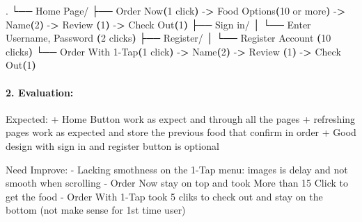 \documentclass[
]{article}
\newenvironment{Shaded}{\begin{snugshade}}{\end{snugshade}}
\newcommand{\BuiltInTok}[1]{#1}
\newcommand{\ErrorTok}[1]{\textcolor[rgb]{0.64,0.00,0.00}{\textbf{#1}}}
\newcommand{\ExtensionTok}[1]{#1}
\newcommand{\KeywordTok}[1]{\textcolor[rgb]{0.13,0.29,0.53}{\textbf{#1}}}
\newcommand{\NormalTok}[1]{#1}
\newcommand{\OperatorTok}[1]{\textcolor[rgb]{0.81,0.36,0.00}{\textbf{#1}}}
\newcommand{\StringTok}[1]{\textcolor[rgb]{0.31,0.60,0.02}{#1}}
\newcommand{\VariableTok}[1]{\textcolor[rgb]{0.00,0.00,0.00}{#1}}
\begin{document}
\begin{Shaded}
\begin{Highlighting}[]
\BuiltInTok{.}
\ExtensionTok{└──}\NormalTok{ Home Page/}
    \ExtensionTok{├──}\NormalTok{ Order Now}\ErrorTok{(}\ExtensionTok{1}\NormalTok{ click}\KeywordTok{)} \ExtensionTok{{-}}\OperatorTok{\textgreater{}}\NormalTok{ Food Options}\ErrorTok{(}\ExtensionTok{10}\NormalTok{ or more}\KeywordTok{)} \ExtensionTok{{-}}\OperatorTok{\textgreater{}}\NormalTok{ Name}\ErrorTok{(}\ExtensionTok{2}\KeywordTok{)} \ExtensionTok{{-}}\OperatorTok{\textgreater{}}\NormalTok{ Review }\ErrorTok{(}\ExtensionTok{1}\KeywordTok{)} \ExtensionTok{{-}}\OperatorTok{\textgreater{}}\NormalTok{ Check Out}\ErrorTok{(}\ExtensionTok{1}\KeywordTok{)}
    \ExtensionTok{├──}\NormalTok{ Sign in/}
    \ExtensionTok{│}\NormalTok{   └── Enter Username, Password }\ErrorTok{(}\ExtensionTok{2}\NormalTok{ clicks}\KeywordTok{)} 
    \ExtensionTok{├──}\NormalTok{ Register/}
    \ExtensionTok{│}\NormalTok{   └── Register Account }\ErrorTok{(}\ExtensionTok{10}\NormalTok{ clicks}\KeywordTok{)}
    \ExtensionTok{└──}\NormalTok{ Order With 1{-}Tap}\ErrorTok{(}\ExtensionTok{1}\NormalTok{ click}\KeywordTok{)} \ExtensionTok{{-}}\OperatorTok{\textgreater{}}\NormalTok{ Name}\ErrorTok{(}\ExtensionTok{2}\KeywordTok{)} \ExtensionTok{{-}}\OperatorTok{\textgreater{}}\NormalTok{ Review }\ErrorTok{(}\ExtensionTok{1}\KeywordTok{)} \ExtensionTok{{-}}\OperatorTok{\textgreater{}}\NormalTok{ Check Out}\ErrorTok{(}\ExtensionTok{1}\KeywordTok{)}
\end{Highlighting}
\end{Shaded}

\hypertarget{evaluation}{%
\paragraph{2. Evaluation:}\label{evaluation}}

\begin{Shaded}
\begin{Highlighting}[]
\NormalTok{Expected:}
\VariableTok{+ Home Button work as expect and through all the pages}
\VariableTok{+ refreshing pages work as expected and store the previous food that confirm in order}
\VariableTok{+ Good design with \textquotesingle{}sign in\textquotesingle{} and \textquotesingle{}register button\textquotesingle{} is optional}

\NormalTok{Need Improve:}
\StringTok{{-} Lacking smothness on the 1{-}Tap menu: images is delay and not smooth when scrolling}
\StringTok{{-} Order Now stay on top and took More than 15 Click to get the food}
\StringTok{{-} Order With 1{-}Tap took 5 cliks to check out and stay on the bottom (not make sense for 1st time user)}
\end{Highlighting}
\end{Shaded}
\end{document}
